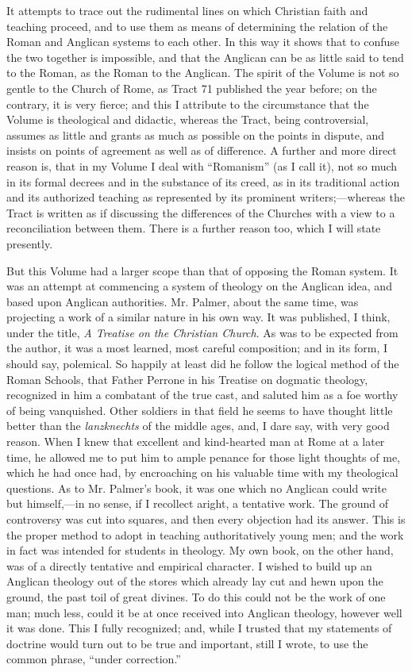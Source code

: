 It attempts to trace out the rudimental lines on which Christian
faith and teaching proceed, and to use them as means of determining the
relation of the Roman and Anglican systems to each other. In this way it
shows that to confuse the two together is impossible, and that the
Anglican can be as little said to tend to the Roman, as the Roman to the
Anglican. The spirit of the Volume is not so gentle to the Church of
Rome, as Tract 71 published the year before; on the contrary, it is very
fierce; and this I attribute to the circumstance that the Volume is
theological and didactic, whereas the Tract, being controversial,
assumes as little and grants as much as possible on the points in
dispute, and insists on points of agreement as well as of difference. A
further and more direct reason is, that in my Volume I deal with
``Romanism'' (as I call it), not so much in its formal decrees
and in the substance of its creed, as in its traditional action and its
authorized teaching as represented by its prominent writers;—whereas
the Tract is written as if discussing the differences of the
Churches with a view to a reconciliation between them. There is a
further reason too, which I will state presently.

But this Volume had a larger scope than that of opposing the Roman
system. It was an attempt at commencing a system of theology on the
Anglican idea, and based upon Anglican authorities. Mr. Palmer, about
the same time, was projecting a work of a similar nature in his own way.
It was published, I think, under the title, \emph{A Treatise on the
Christian Church}. As was to be expected from the author, it was a
most learned, most careful composition; and in its form, I should say,
polemical. So happily at least did he follow the logical method of the
Roman Schools, that Father Perrone in his Treatise on dogmatic theology,
recognized in him a combatant of the true cast, and saluted him as a foe
worthy of being vanquished. Other soldiers in that field he seems to
have thought little better than the \emph{lanzknechts} of the middle
ages, and, I dare say, with very good reason. When I knew that excellent
and kind-hearted man at Rome at a later time, he allowed me to put him
to ample penance for those light thoughts of me, which he had once had,
by encroaching on his valuable time with my theological questions. As to
Mr. Palmer's book, it was one which no Anglican could write but himself,—in
no sense, if I recollect aright, a tentative work. The ground of
controversy was cut into squares, and then every objection had its
answer. This is the proper method to adopt in teaching authoritatively
young men; and the work in fact was intended for students in theology.
My own book, on the other hand, was of a directly tentative and
empirical character. I wished to build up an Anglican theology out of
the stores which already lay cut and hewn upon the ground, the past toil
of great divines. To do this could not be the work of one man; much
less, could it be at once received into Anglican theology, however well
it was done. This I fully recognized; and, while I
trusted that my statements of doctrine would turn out to be true
and important, still I wrote, to use the common phrase,
``under correction.''

